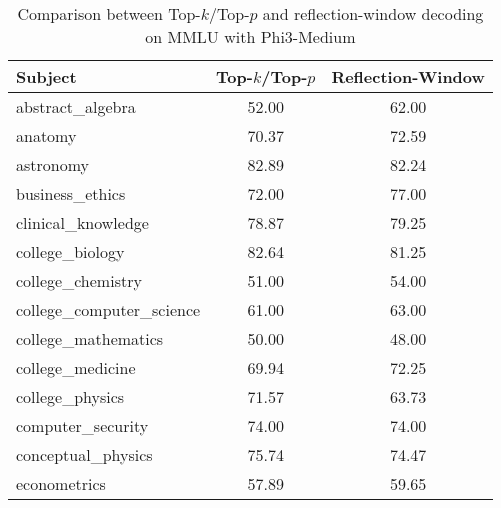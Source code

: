 \begingroup
\renewcommand{\arraystretch}{1}
\begin{table}[t]
    \caption{Comparison between Top-$k$/Top-$p$ and reflection-window decoding on MMLU with Phi3-Medium}
    \label{tab:decoding_comparison_phi3}
    \centering
    \footnotesize
    \begin{tabular}{L{0.35}C{0.20}C{0.20}}
        \toprule
        \textbf{Subject}                        & \textbf{Top-$k$/Top-$p$} & \textbf{Reflection-Window} \\
        \midrule
        abstract\_algebra                       & 52.00                    & 62.00                      \\
        anatomy                                 & 70.37                    & 72.59                      \\
        astronomy                               & 82.89                    & 82.24                      \\
        business\_ethics                        & 72.00                    & 77.00                      \\
        clinical\_knowledge                     & 78.87                    & 79.25                      \\
        college\_biology                        & 82.64                    & 81.25                      \\
        college\_chemistry                      & 51.00                    & 54.00                      \\
        college\_computer\_science              & 61.00                    & 63.00                      \\
        college\_mathematics                    & 50.00                    & 48.00                      \\
        college\_medicine                       & 69.94                    & 72.25                      \\
        college\_physics                        & 71.57                    & 63.73                      \\
        computer\_security                      & 74.00                    & 74.00                      \\
        conceptual\_physics                     & 75.74                    & 74.47                      \\
        econometrics                            & 57.89                    & 59.65                      \\

\end{tabular}
\end{table}
